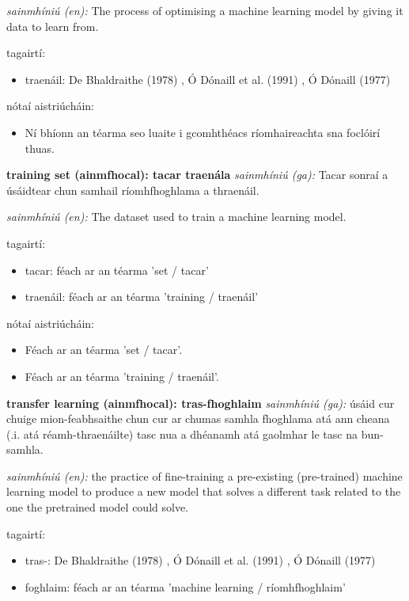 \documentclass{article}
\begin{document}
\textit{sainmhíniú (en):} The process of optimising a machine learning model by giving it data to learn from.

tagairtí:
\begin{itemize}
	\item traenáil: De Bhaldraithe (1978) \cite{de-bhaldraithe}, Ó Dónaill et al. (1991) \cite{focloir-beag}, Ó Dónaill (1977) \cite{odonaill}
\end{itemize}

nótaí aistriúcháin:
\begin{itemize}
	\item Ní bhíonn an téarma seo luaite i gcomhthéacs ríomhaireachta sna foclóirí thuas.
\end{itemize}


\textbf{training set (ainmfhocal): tacar traenála}
\textit{sainmhíniú (ga):} Tacar sonraí a úsáidtear chun samhail ríomhfhoghlama a thraenáil.

\textit{sainmhíniú (en):} The dataset used to train a machine learning model.

tagairtí:
\begin{itemize}
	\item tacar: féach ar an téarma 'set / tacar'
	\item traenáil: féach ar an téarma 'training / traenáil'
\end{itemize}

nótaí aistriúcháin:
\begin{itemize}
	\item Féach ar an téarma 'set / tacar'.
	\item Féach ar an téarma 'training / traenáil'.
\end{itemize}


\textbf{transfer learning (ainmfhocal): tras-fhoghlaim}
\textit{sainmhíniú (ga):} úsáid cur chuige mion-feabhsaithe chun cur ar chumas samhla fhoghlama atá ann cheana (.i. atá réamh-thraenáilte) tasc nua a dhéanamh atá gaolmhar le tasc na bun-samhla.

\textit{sainmhíniú (en):} the practice of fine-training a pre-existing (pre-trained) machine learning model to produce a new model that solves a different task related to the one the pretrained model could solve.

tagairtí:
\begin{itemize}
	\item tras-: De Bhaldraithe (1978) \cite{de-bhaldraithe}, Ó Dónaill et al. (1991) \cite{focloir-beag}, Ó Dónaill (1977) \cite{odonaill}
	\item foghlaim: féach ar an téarma 'machine learning / ríomhfhoghlaim'
\end{itemize}
\end{document}
